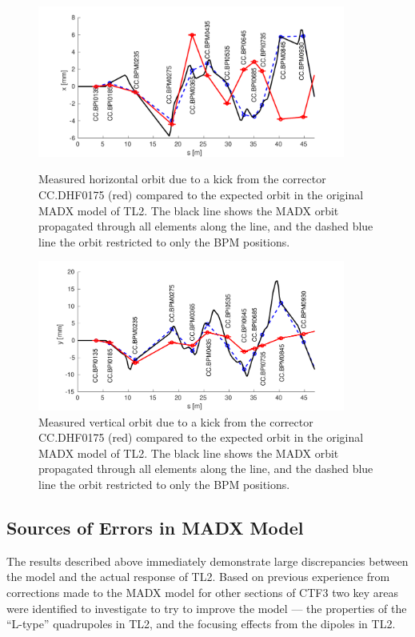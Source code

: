 \begin{figure}
  \centering
  \includegraphics[width=0.9\textwidth]{Figures/optics/modelOriginalH}
  \caption{Measured horizontal orbit due to a kick from the corrector CC.DHF0175 (red) compared to the expected orbit in the original MADX model of TL2. The black line shows the MADX orbit propagated through all elements along the line, and the dashed blue line the orbit restricted to only the BPM positions.}
  \label{f:modelOriginalH}
  \includegraphics[width=0.9\textwidth]{Figures/optics/modelOriginalV}
  \caption{Measured vertical orbit due to a kick from the corrector CC.DHF0175 (red) compared to the expected orbit in the original MADX model of TL2. The black line shows the MADX orbit propagated through all elements along the line, and the dashed blue line the orbit restricted to only the BPM positions.}
  \label{f:modelOriginalV}
\end{figure}

\subsection{Sources of Errors in MADX Model}
\label{ss:modelErrorSources}

The results described above immediately demonstrate large discrepancies between the model and the actual response of TL2. Based on previous experience from corrections made to the MADX model for other sections of CTF3 \cite{benOptics} two key areas were identified to investigate to try to improve the model --- the properties of the ``L-type'' quadrupoles in TL2, and the focusing effects from the dipoles in TL2.

